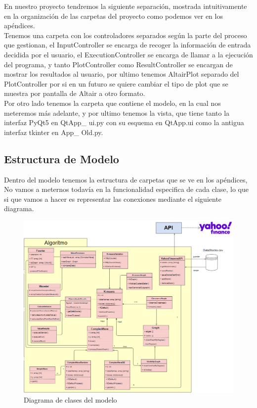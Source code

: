 \documentclass[12pt,a4paper]{article}
\begin{document}
	En nuestro proyecto tendremos la siguiente separación, mostrada intuitivamente en la organización de las carpetas del proyecto como podemos ver en los apéndices.\\
	Tenemos una carpeta con los controladores separados según la parte del proceso que gestionan, el InputController se encarga de recoger la información de entrada decidida por el usuario, el ExecutionController se encarga de llamar a la ejecución del programa, y tanto PlotController como ResultController se encargan de mostrar los resultados al usuario, por ultimo tenemos AltairPlot separado del PlotController por si en un futuro se quiere cambiar el tipo de plot que se muestra por pantalla de Altair a otro formato.\\
	Por otro lado tenemos la carpeta que contiene el modelo, en la cual nos meteremos más adelante, y por ultimo tenemos la vista, que tiene tanto la interfaz PyQt5 en QtApp\_ ui.py con su esquema en QtApp.ui como la antigua interfaz tkinter en App\_ Old.py.\\
	\subsection{Estructura de Modelo}
	Dentro del modelo tenemos la estructura de carpetas que se ve en los apéndices,\\
	No vamos a meternos todavía en la funcionalidad especifica de cada clase, lo que si que vamos a hacer es representar las conexiones mediante el siguiente diagrama.\\
\begin{figure}[H]
\centering
  \centering
  \includegraphics[width=1\linewidth]{Diagrama clases}
\caption{Diagrama de clases del modelo}
\label{fig:subrgrafo}
\end{figure}
\end{document}
